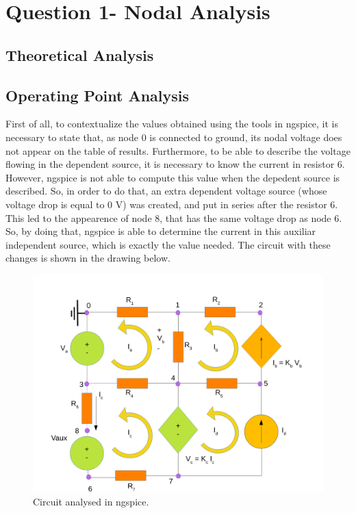 \section{Question 1- Nodal Analysis}


\subsection{Theoretical Analysis}




\subsection{Operating Point Analysis}
First of all, to contextualize the values obtained using the tools in ngspice, it is necessary to state that, as node 0 is connected to ground, its nodal voltage does not appear on the table of results. Furthermore, to be able to describe the voltage flowing in the dependent source, it is necessary to know the current in resistor 6. However, ngspice is not able to compute this value when the depedent source is described. So, in order to do that, an extra dependent voltage source (whose voltage drop is equal to 0 V) was created, and put in series after the resistor 6. This led to the appearence of node 8, that has the same voltage drop as node 6. So, by doing that, ngspice is able to determine the current in this auxiliar independent source, which is exactly the value needed.
 The circuit with these changes is shown in the drawing below.

\begin{figure}[ht] \centering
\includegraphics[width=1.0\linewidth]{simdraw.pdf}
\caption{Circuit analysed in ngspice.}
\label{simdraw}
\end{figure}

